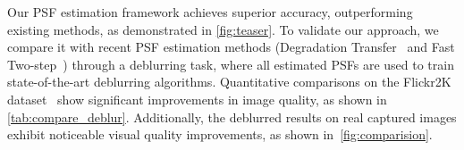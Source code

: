 Our PSF estimation framework achieves superior accuracy, outperforming existing methods, as demonstrated in \cref{fig:teaser}. To validate our approach, we compare it with recent PSF estimation methods (Degradation Transfer~\cite{chen2021extreme} and Fast Two-step~\cite{eboli2022fast}) through a deblurring task, where all estimated PSFs are used to train state-of-the-art deblurring algorithms. Quantitative comparisons on the Flickr2K dataset~\cite{lim2017enhanced} show significant improvements in image quality, as shown in \cref{tab:compare_deblur}. Additionally, the deblurred results on real captured images exhibit noticeable visual quality improvements, as shown in~\cref{fig:comparision}.








